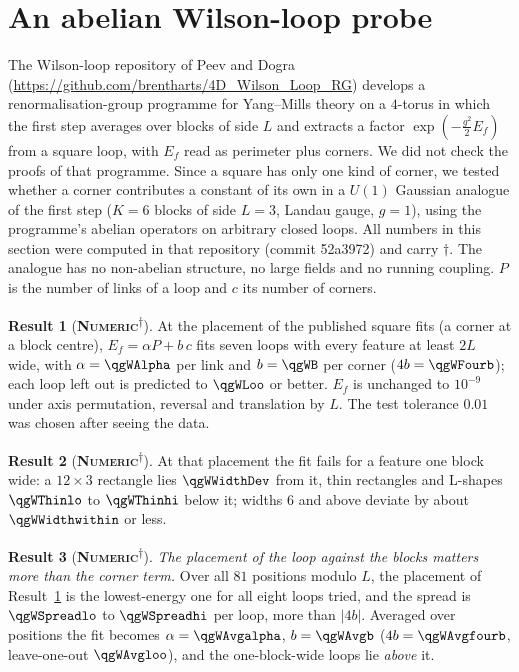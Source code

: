 \documentclass[11pt]{article}
\newcommand{\numeric}{\textbf{\textsc{Numeric}}}
\newcommand{\snap}{\textsuperscript{$\dagger$}}      %
\theoremstyle{definition}
\newtheorem{result}{Result}
\begin{document}
\section{An abelian Wilson-loop probe}\label{sec:wilson}
The Wilson-loop repository of Peev and Dogra (\url{https://github.com/brentharts/4D_Wilson_Loop_RG}) develops a renormalisation-group programme for Yang--Mills theory on a $4$-torus in which the first step averages over blocks of side $L$ and extracts a factor $\exp(-\tfrac{g^2}{2}E_f)$ from a square loop, with $E_f$ read as perimeter plus corners. We did not check the proofs of that programme. Since a square has only one kind of corner, we tested whether a corner contributes a constant of its own in a $U(1)$ Gaussian analogue of the first step ($K=6$ blocks of side $L=3$, Landau gauge, $g=1$), using the programme's abelian operators on arbitrary closed loops. All numbers in this section were computed in that repository (commit 52a3972) and carry $\dagger$. The analogue has no non-abelian structure, no large fields and no running coupling. $P$ is the number of links of a loop and $c$ its number of corners.
\begin{result}[\numeric\snap]\label{res:wl-fit}
At the placement of the published square fits (a corner at a block centre), $E_f=\alpha P+b\,c$ fits seven loops with every feature at least $2L$ wide, with $\alpha=\qgWAlpha$ per link and $b=\qgWB$ per corner ($4b=\qgWFourb$); each loop left out is predicted to $\qgWLoo$ or better. $E_f$ is unchanged to $10^{-9}$ under axis permutation, reversal and translation by $L$. The test tolerance $0.01$ was chosen after seeing the data.
\end{result}
\begin{result}[\numeric\snap]\label{res:wl-thin}
At that placement the fit fails for a feature one block wide: a $12\times3$ rectangle lies $\qgWWidthDev$ from it, thin rectangles and L-shapes $\qgWThinlo$ to $\qgWThinhi$ below it; widths $6$ and above deviate by about $\qgWWidthwithin$ or less.
\end{result}
\begin{result}[\numeric\snap]\label{res:wl-place}
\emph{The placement of the loop against the blocks matters more than the corner term.} Over all $81$ positions modulo $L$, the placement of Result~\ref{res:wl-fit} is the lowest-energy one for all eight loops tried, and the spread is $\qgWSpreadlo$ to $\qgWSpreadhi$ per loop, more than $|4b|$. Averaged over positions the fit becomes $\alpha=\qgWAvgalpha$, $b=\qgWAvgb$ ($4b=\qgWAvgfourb$, leave-one-out $\qgWAvgloo$), and the one-block-wide loops lie \emph{above} it.
\end{result}
\end{document}
